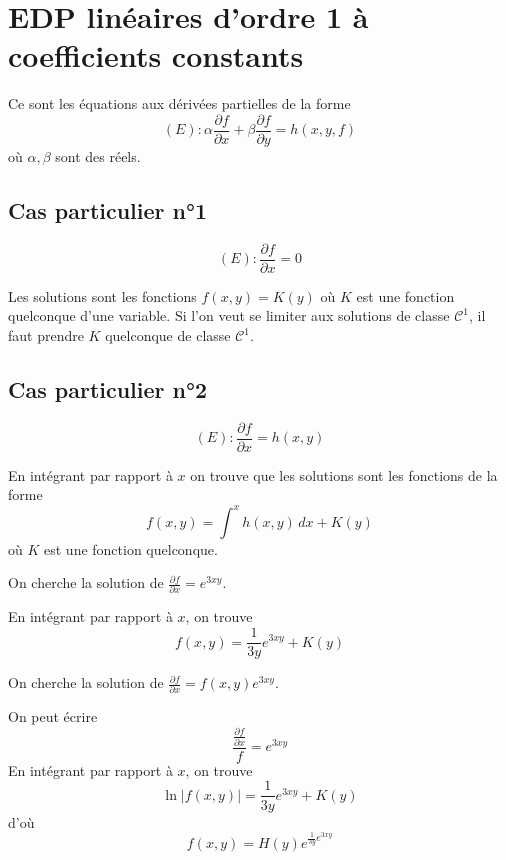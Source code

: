 \documentclass[12pt]{article}
\newcounter{definition}
\newcounter{exercice}
\begin{document}
\section{EDP linéaires d'ordre 1 à coefficients constants}

\begin{definition}
Ce sont les équations aux dérivées partielles de la forme
$$
(E): \alpha \frac{\partial f}{\partial x} + \beta \frac{\partial f}{\partial y} = h(x, y, f)
$$
où $\alpha, \beta$ sont des réels.
\end{definition}

\subsection{Cas particulier n°1}

$$
(E): \frac{\partial f}{\partial x} = 0
$$

Les solutions sont les fonctions $f(x, y)=K(y)$ où $K$ est une fonction quelconque d'une variable. Si l'on veut se limiter aux solutions de classe $\mathcal{C}^{1}$, il faut prendre $K$ quelconque de classe $\mathcal{C}^{1}$.

\subsection{Cas particulier n°2}

$$
(E): \frac{\partial f}{\partial x} = h(x, y)
$$

En intégrant par rapport à $x$ on trouve que les solutions sont les fonctions de la forme
$$
f(x, y) = \int^{x} h(x, y)\, dx + K(y)
$$
où $K$ est une fonction quelconque.

\begin{exercice}
On cherche la solution de $\frac{\partial f}{\partial x} = e^{3xy}$.
\end{exercice}

\begin{corrige}
En intégrant par rapport à $x$, on trouve
$$
f(x, y) = \frac{1}{3y} e^{3xy} + K(y)
$$
\end{corrige}

\begin{exercice}
On cherche la solution de $\frac{\partial f}{\partial x} = f(x, y) e^{3xy}$.
\end{exercice}

\begin{corrige}
On peut écrire
$$
\frac{\frac{\partial f}{\partial x}}{f} = e^{3xy}
$$
En intégrant par rapport à $x$, on trouve
$$
\ln |f(x, y)| = \frac{1}{3y} e^{3xy} + K(y)
$$
d'où
$$
f(x, y) = H(y) e^{\frac{1}{3y} e^{3xy}}
$$
\end{corrige}
\end{document}
